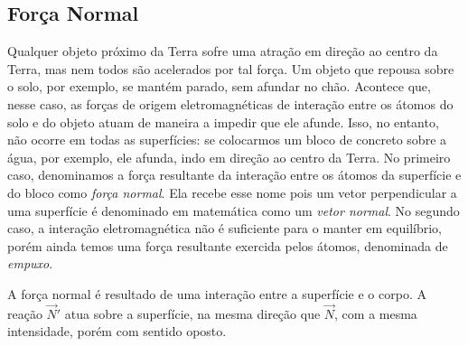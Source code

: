 \subsection{Força Normal} 

Qualquer objeto próximo da Terra sofre uma atração em direção ao centro da Terra, mas nem todos são acelerados por tal força. Um objeto que repousa sobre o solo, por exemplo, se mantém parado, sem afundar no chão. Acontece que, nesse caso, as forças de origem eletromagnéticas de interação entre os átomos do solo e do objeto atuam de maneira a impedir que ele afunde. Isso, no entanto, não ocorre em todas as superfícies: se colocarmos um bloco de concreto sobre a água, por exemplo, ele afunda, indo em direção ao centro da Terra. No primeiro caso, denominamos a força resultante da interação entre os átomos da superfície e do bloco como \emph{força normal}. Ela recebe esse nome pois um vetor perpendicular a uma superfície é denominado em matemática como um \emph{vetor normal}. No segundo caso, a interação eletromagnética não é suficiente para o manter em equilíbrio, porém ainda temos uma força resultante exercida pelos átomos, denominada de \emph{empuxo}.

\begin{marginfigure}[4cm]
\centering
{}
\caption{A força normal é resultado de uma interação entre a superfície e o corpo. A reação $\vec{N}'$ atua sobre a superfície, na mesma direção que $\vec{N}$, com a mesma intensidade, porém com sentido oposto.}
\end{marginfigure}

